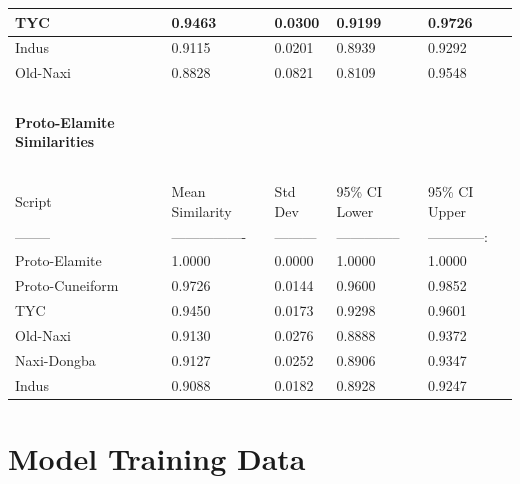 \documentclass[11pt,a4paper,oneside]{report}
\begin{document}
\begin{table}[H]
\begin{tabular}{|l|l|l|l|l|}
        TYC & 0.9463 & 0.0300 & 0.9199 & 0.9726 \\ \hline
        Indus & 0.9115 & 0.0201 & 0.8939 & 0.9292 \\ \hline
        Old-Naxi & 0.8828 & 0.0821 & 0.8109 & 0.9548 \\ \hline
        ~ & ~ & ~ & ~ & ~ \\ \hline
        \textbf{Proto-Elamite Similarities} & ~ & ~ & ~ & ~ \\ \hline
        ~ & ~ & ~ & ~ & ~ \\ \hline
        Script & Mean Similarity & Std Dev & 95\% CI Lower & 95\% CI Upper \\ \hline
        -------- & ---------------- & --------- & -------------- & ------------: \\ \hline
        Proto-Elamite & 1.0000 & 0.0000 & 1.0000 & 1.0000 \\ \hline
        Proto-Cuneiform & 0.9726 & 0.0144 & 0.9600 & 0.9852 \\ \hline
        TYC & 0.9450 & 0.0173 & 0.9298 & 0.9601 \\ \hline
        Old-Naxi & 0.9130 & 0.0276 & 0.8888 & 0.9372 \\ \hline
        Naxi-Dongba & 0.9127 & 0.0252 & 0.8906 & 0.9347 \\ \hline
        Indus & 0.9088 & 0.0182 & 0.8928 & 0.9247 \\ \hline
    \end{tabular}
\end{table}

\newpage
\section{Model Training Data}
\label{app: model-train}
\end{document}
